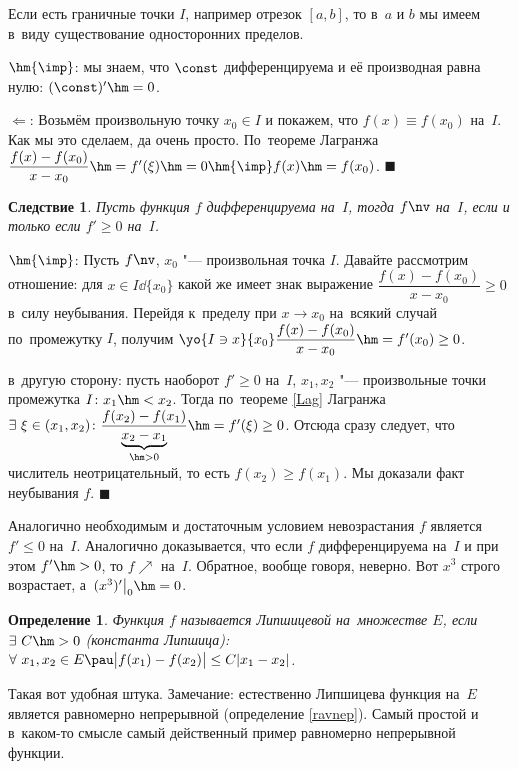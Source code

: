 \documentclass[a4paper,10pt,twoside]{article}
\newtheorem{Def}{Определение}[section]
\newtheorem{Sl}{Следствие}[section]
\newenvironment{Proof}
       {\par\noindent{\textbf{Доказательство.}}}
       {\hfill$\scriptstyle\blacksquare$}
\begin{document}
Если есть граничные точки $I$, например отрезок $[a,b]$, то в~$a$ и $b$ мы имеем в~виду существование односторонних пределов.


\begin{Proof}
    $\hm{\imp}$: мы знаем, что $\const$ дифференцируема и её производная равна нулю: $(\const)'\hm=0$.

    $\Leftarrow$: Возьмём произвольную точку $x_0\in I$ и покажем, что $f(x)\equiv f(x_0)$ на~$I$. Как мы это сделаем, да очень просто. По~теореме Лагранжа
    $\dfrac{f(x)-f(x_0)}{x-x_0}\hm=f'(\xi)\hm=0\hm{\imp} f(x)\hm=f(x_0)$.
\end{Proof}

\begin{Sl}
    Пусть функция $f$ дифференцируема на~$I$, тогда $f\nv$ на~$I$, если и только если $f'\geq0$ на~$I$.
\end{Sl}

\begin{Proof}
    $\hm{\imp}$: Пусть $f\nv$, $x_0$ "--- произвольная точка $I$. Давайте рассмотрим отношение: для $x\in I\dd\{x_0\}$ какой же имеет знак выражение
    $\dfrac{f(x)-f(x_0)}{x-x_0}\geq0$ в~силу неубывания. Перейдя к~пределу при $x\to x_0$ на~всякий случай по~промежутку $I$, получим
    $\yo{I\ni x}{x_0}\dfrac{f(x)-f(x_0)}{x-x_0}\hm=f'(x_0)\geq0$.

    в~другую сторону: пусть наоборот $f'\geq0$ на~$I$, $x_1,x_2$ "--- произвольные точки промежутка $I\colon x_1\hm<x_2$.
    Тогда по~теореме \ref{Lag} Лагранжа $\exists\  \xi\in(x_1,x_2)\colon \dfrac{f(x_2)-f(x_1)}{\underbrace{x_2-x_1}_{\hm>0}}\hm=f'(\xi)\geq0$.
    Отсюда сразу следует, что числитель неотрицательный, то есть $f(x_2)\geq f(x_1)$. Мы доказали факт неубывания $f$.
\end{Proof}

Аналогично необходимым и достаточным условием невозрастания $f$ является $f'
\leq0$ на~$I$.
Аналогично доказывается, что если $f$ дифференцируема на~$I$ и при этом $f'\hm>0$, то $f\nearrow$ на~$I$. Обратное, вообще говоря, неверно. Вот $x^3$ строго
возрастает, а~$(x^3)'\big|_0\hm=0$.

\begin{Def}
    Функция $f$ называется Липшицевой на~множестве $E$, если $\exists\  C\hm>0$ (константа Липшица): $\forall\  x_1,x_2\in E\pau
    \big|f(x_1)-f(x_2)\big|\leq C|x_1-x_2|$.
\end{Def}

Такая вот удобная штука. Замечание: естественно Липшицева функция на~$E$ является равномерно непрерывной (определение \ref{ravnep}). Самый простой и в~каком-то смысле самый действенный пример равномерно непрерывной функции.
\end{document}
